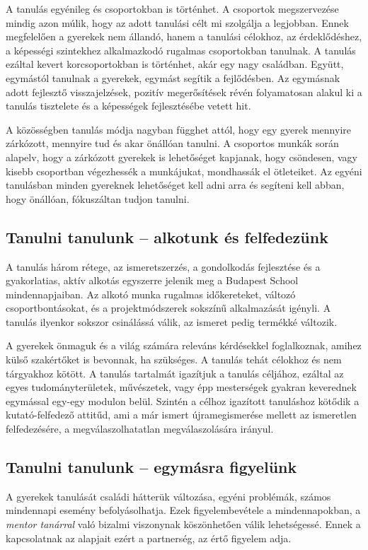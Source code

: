 A tanulás egyénileg és csoportokban is történhet. A csoportok megszervezése mindig azon múlik, hogy az adott tanulási célt mi szolgálja a legjobban. Ennek megfelelően a gyerekek nem állandó, hanem a tanulási célokhoz, az érdeklődéshez, a képességi szintekhez alkalmazkodó rugalmas csoportokban tanulnak. A tanulás ezáltal kevert korcsoportokban is történhet, akár egy nagy családban. Együtt, egymástól tanulnak a gyerekek, egymást segítik a fejlődésben. Az egymásnak adott fejlesztő visszajelzések, pozitív megerősítések révén folyamatosan alakul ki a tanulás tisztelete és a képességek fejlesztésébe vetett hit.

A közösségben tanulás módja nagyban függhet attól, hogy egy gyerek mennyire zárkózott, mennyire tud és akar önállóan tanulni. A csoportos munkák során alapelv, hogy a zárkózott gyerekek is lehetőséget kapjanak, hogy csöndesen, vagy kisebb csoportban végezhessék a munkájukat, mondhassák el ötleteiket. Az egyéni tanulásban minden gyereknek lehetőséget kell adni arra és segíteni kell abban, hogy önállóan, fókuszáltan tudjon tanulni.%

\subsection{Tanulni tanulunk -- alkotunk és felfedezünk}
A tanulás három rétege, az ismeretszerzés, a gondolkodás fejlesztése és a gyakorlatias, aktív alkotás egyszerre jelenik meg a Budapest School mindennapjaiban. Az alkotó munka rugalmas időkereteket, változó csoportbontásokat, és a projektmódszerek sokszínű alkalmazását igényli. A tanulás ilyenkor sokszor csinálássá válik, az ismeret pedig termékké változik.

A gyerekek önmaguk és a világ számára releváns kérdésekkel foglalkoznak, amihez külső szakértőket is bevonnak, ha szükséges. A tanulás tehát célokhoz és nem tárgyakhoz kötött. A tanulás tartalmát igazítjuk a tanulás céljához, ezáltal az egyes tudományterületek, művészetek, vagy épp mesterségek gyakran keverednek egymással egy-egy modulon belül. Szintén a célhoz igazított tanuláshoz kötődik a kutató-felfedező attitűd, ami a már ismert újramegismerése mellett az ismeretlen felfedezésére, a megválaszolhatatlan megválaszolására irányul.

\subsection{Tanulni tanulunk -- egymásra figyelünk}

A gyerekek tanulását családi hátterük változása, egyéni problémák,
számos mindennapi esemény befolyásolhatja. Ezek figyelembevétele
a
mindennapokban, a \emph{mentor tanárral} való bizalmi viszonynak köszönhetően válik lehetségessé. Ennek a kapcsolatnak az alapjait ezért a partnerség, az értő figyelem adja.

